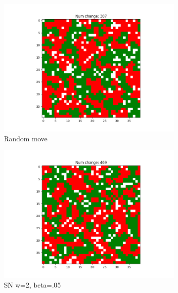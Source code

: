 \documentclass[11pt]{article}
\begin{document}
	\begin{figure}[h]
		\centering
		\begin{subfigure}{0.14\textwidth}
			\includegraphics[width=\linewidth]{final_random.png}
			\caption{\centering Random move}
			\label{sn_finalrandom}
		\end{subfigure}\hfill
		\begin{subfigure}{0.14\textwidth}
			\includegraphics[width=\linewidth]{final_rachael_w2b5.png}
			\caption{\centering SN w=2, beta=.05}
			\label{sn_finalw5b10}
		\end{subfigure}\hfill
		\begin{subfigure}{0.14\textwidth}

\end{subfigure}
\end{figure}
\end{document}
